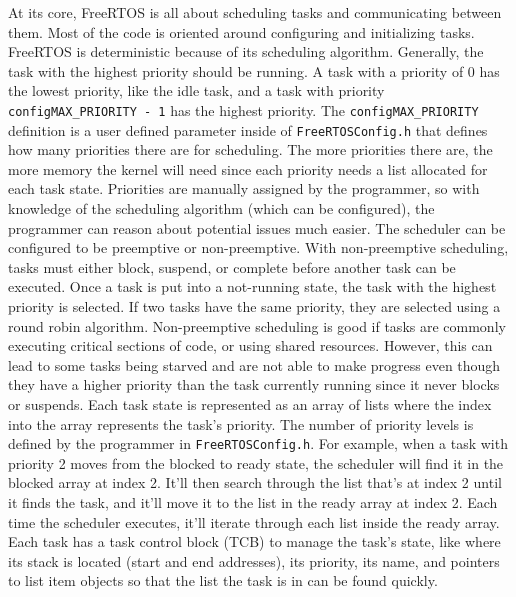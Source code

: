 At its core, FreeRTOS is all about scheduling tasks and communicating between
them. Most of the code is oriented around configuring and initializing tasks.
FreeRTOS is deterministic because of its scheduling algorithm. Generally, the
task with the highest priority should be running. A task with a priority of 0
has the lowest priority, like the idle task, and a task with priority
\texttt{configMAX\_PRIORITY - 1} has the highest priority. The
\texttt{configMAX\_PRIORITY} definition is a user defined parameter inside of
\texttt{FreeRTOSConfig.h} that defines how many priorities there are for scheduling. The
more priorities there are, the more memory the kernel will need since each
priority needs a list allocated for each task state. Priorities are manually
assigned by the programmer, so with knowledge of the scheduling algorithm (which
can be configured), the programmer can reason about potential issues much
easier. The scheduler can be configured to be preemptive or non-preemptive. With
non-preemptive scheduling, tasks must either block, suspend, or complete before
another task can be executed. Once a task is put into a not-running state, the
task with the highest priority is selected. If two tasks have the same priority,
they are selected using a round robin algorithm. Non-preemptive scheduling is
good if tasks are commonly executing critical sections of code, or using shared
resources.  However, this can lead to some tasks being starved and are not able
to make progress even though they have a higher priority than the task currently
running since it never blocks or suspends. Each task state is represented as an
array of lists where the index into the array represents the task's priority.
The number of priority levels is defined by the programmer in \texttt{FreeRTOSConfig.h}.
For example, when a task with priority 2 moves from the blocked to ready state,
the scheduler will find it in the blocked array at index 2. It'll then search
through the list that's at index 2 until it finds the task, and it'll move it to
the list in the ready array at index 2. Each time the scheduler executes, it'll
iterate through each list inside the ready array. Each task has a task control
block (TCB) to manage the task's state, like where its stack is located (start
and end addresses), its priority, its name, and pointers to list item objects so
that the list the task is in can be found quickly.

